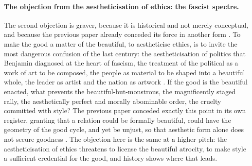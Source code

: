 \paragraph{The objection from the aestheticisation of ethics: the fascist spectre.}
The second objection is graver, because it is historical and not merely conceptual, and because the previous paper already conceded its force in another form \parencite{paperxx}. To make the good a matter of the beautiful, to aestheticise ethics, is to invite the most dangerous confusion of the last century: the aestheticisation of politics that Benjamin diagnosed at the heart of fascism, the treatment of the political as a work of art to be composed, the people as material to be shaped into a beautiful whole, the leader as artist and the nation as artwork \parencite{benjamin1969}. If the good is the beautiful enacted, what prevents the beautiful-but-monstrous, the magnificently staged rally, the aesthetically perfect and morally abominable order, the cruelty committed with style? The previous paper conceded exactly this point in its own register, granting that a relation could be formally beautiful, could have the geometry of the good cycle, and yet be unjust, so that aesthetic form alone does not secure goodness \parencite{paperxx}. The objection here is the same at a higher pitch: the aestheticisation of ethics threatens to license the beautiful atrocity, to make style a sufficient credential for the good, and history shows where that leads.


